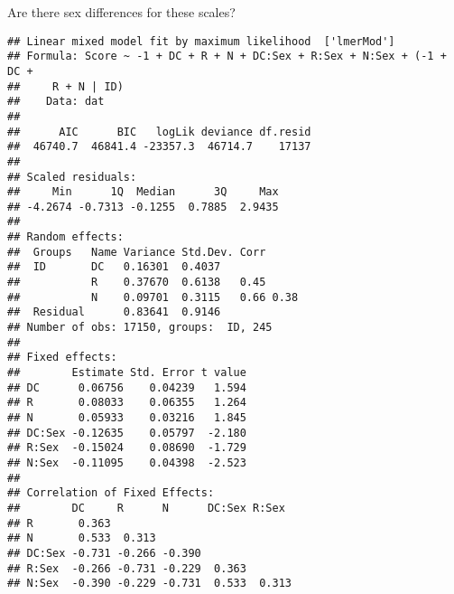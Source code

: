 \documentclass[]{article}
\newenvironment{Shaded}{\begin{snugshade}}{\end{snugshade}}
\newcommand{\KeywordTok}[1]{\textcolor[rgb]{0.13,0.29,0.53}{\textbf{#1}}}
\newcommand{\DataTypeTok}[1]{\textcolor[rgb]{0.13,0.29,0.53}{#1}}
\newcommand{\DecValTok}[1]{\textcolor[rgb]{0.00,0.00,0.81}{#1}}
\newcommand{\StringTok}[1]{\textcolor[rgb]{0.31,0.60,0.02}{#1}}
\newcommand{\OperatorTok}[1]{\textcolor[rgb]{0.81,0.36,0.00}{\textbf{#1}}}
\newcommand{\NormalTok}[1]{#1}
\begin{document}
Are there sex differences for these scales?

\begin{Shaded}
\end{Shaded}

\begin{verbatim}
## Linear mixed model fit by maximum likelihood  ['lmerMod']
## Formula: Score ~ -1 + DC + R + N + DC:Sex + R:Sex + N:Sex + (-1 + DC +  
##     R + N | ID)
##    Data: dat
## 
##      AIC      BIC   logLik deviance df.resid 
##  46740.7  46841.4 -23357.3  46714.7    17137 
## 
## Scaled residuals: 
##     Min      1Q  Median      3Q     Max 
## -4.2674 -0.7313 -0.1255  0.7885  2.9435 
## 
## Random effects:
##  Groups   Name Variance Std.Dev. Corr     
##  ID       DC   0.16301  0.4037            
##           R    0.37670  0.6138   0.45     
##           N    0.09701  0.3115   0.66 0.38
##  Residual      0.83641  0.9146            
## Number of obs: 17150, groups:  ID, 245
## 
## Fixed effects:
##        Estimate Std. Error t value
## DC      0.06756    0.04239   1.594
## R       0.08033    0.06355   1.264
## N       0.05933    0.03216   1.845
## DC:Sex -0.12635    0.05797  -2.180
## R:Sex  -0.15024    0.08690  -1.729
## N:Sex  -0.11095    0.04398  -2.523
## 
## Correlation of Fixed Effects:
##        DC     R      N      DC:Sex R:Sex 
## R       0.363                            
## N       0.533  0.313                     
## DC:Sex -0.731 -0.266 -0.390              
## R:Sex  -0.266 -0.731 -0.229  0.363       
## N:Sex  -0.390 -0.229 -0.731  0.533  0.313
\end{verbatim}
\end{document}
